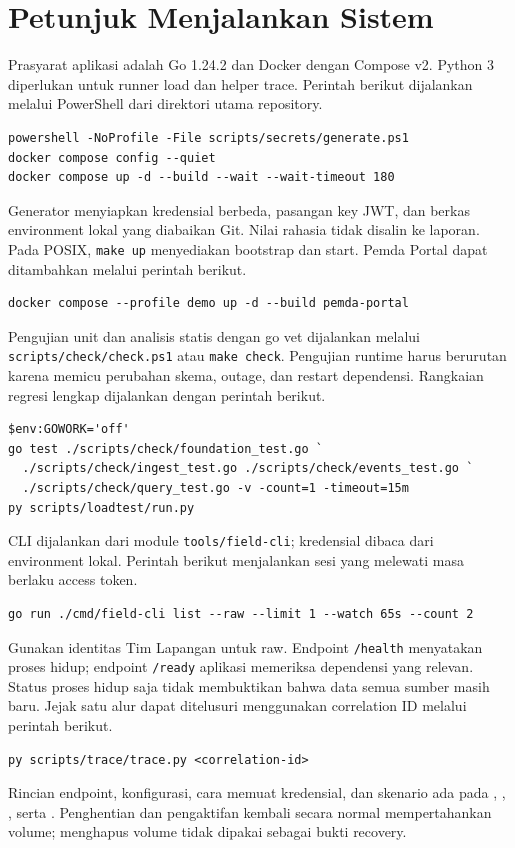 \section{Petunjuk Menjalankan Sistem}
\label{sec:run}
Prasyarat aplikasi adalah Go 1.24.2 dan Docker dengan Compose v2. Python 3 diperlukan untuk runner load dan helper trace. Perintah berikut dijalankan melalui PowerShell dari direktori utama repository.
\begin{lstlisting}[numbers=none]
powershell -NoProfile -File scripts/secrets/generate.ps1
docker compose config --quiet
docker compose up -d --build --wait --wait-timeout 180
\end{lstlisting}
Generator menyiapkan kredensial berbeda, pasangan key JWT, dan berkas environment lokal yang diabaikan Git. Nilai rahasia tidak disalin ke laporan. Pada POSIX, \texttt{make up} menyediakan bootstrap dan start. Pemda Portal dapat ditambahkan melalui perintah berikut.
\begin{lstlisting}[numbers=none]
docker compose --profile demo up -d --build pemda-portal
\end{lstlisting}

Pengujian unit dan analisis statis dengan go vet dijalankan melalui \nolinkurl{scripts/check/check.ps1} atau \texttt{make check}. Pengujian runtime harus berurutan karena memicu perubahan skema, outage, dan restart dependensi. Rangkaian regresi lengkap dijalankan dengan perintah berikut.
\begin{lstlisting}[numbers=none]
$env:GOWORK='off'
go test ./scripts/check/foundation_test.go `
  ./scripts/check/ingest_test.go ./scripts/check/events_test.go `
  ./scripts/check/query_test.go -v -count=1 -timeout=15m
py scripts/loadtest/run.py
\end{lstlisting}

CLI dijalankan dari module \nolinkurl{tools/field-cli}; kredensial dibaca dari environment lokal. Perintah berikut menjalankan sesi yang melewati masa berlaku access token.
\begin{lstlisting}[numbers=none]
go run ./cmd/field-cli list --raw --limit 1 --watch 65s --count 2
\end{lstlisting}
Gunakan identitas Tim Lapangan untuk raw. Endpoint \texttt{/health} menyatakan proses hidup; endpoint \texttt{/ready} aplikasi memeriksa dependensi yang relevan. Status proses hidup saja tidak membuktikan bahwa data semua sumber masih baru. Jejak satu alur dapat ditelusuri menggunakan correlation ID melalui perintah berikut.
\begin{lstlisting}[numbers=none]
py scripts/trace/trace.py <correlation-id>
\end{lstlisting}
Rincian endpoint, konfigurasi, cara memuat kredensial, dan skenario ada pada , , , serta . Penghentian dan pengaktifan kembali secara normal mempertahankan volume; menghapus volume tidak dipakai sebagai bukti recovery.
